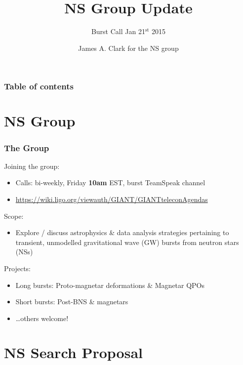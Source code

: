 \documentclass{beamer}
\def\gw#1{gravitational wave#1 (GW#1)\gdef\gw{GW}}
\def\ns#1{neutron star#1 (NS#1)\gdef\ns{NS}}
\begin{document}
\title{NS Group Update}
\subtitle{Burst Call Jan 21$^{\text{st}}$ 2015}  
\author{James A. Clark for the NS group}
\date{} 

\begin{frame}[plain]
\titlepage
\end{frame}

\begin{frame}\frametitle{Table of contents}\tableofcontents
\end{frame} 

\section{NS Group}

\begin{frame}
    \frametitle{The Group}
    Joining the group:
    \begin{itemize}
        \item Calls: bi-weekly, Friday {\bf 10am} EST, burst TeamSpeak channel
        \item
            {\small\href{https://wiki.ligo.org/viewauth/GIANT/GIANTteleconAgendas}
            {https://wiki.ligo.org/viewauth/GIANT/GIANTteleconAgendas}}
    \end{itemize}
    Scope:
    \begin{itemize}
        \item Explore / discuss astrophysics \& data analysis strategies
            pertaining to transient, unmodelled \gw{} bursts from \ns{s}
    \end{itemize}
    Projects:
    \begin{itemize}
        \item Long bursts: Proto-magnetar deformations \& Magnetar QPOs
        \item Short bursts: Post-BNS \& magnetars
        \item \dots others welcome!
    \end{itemize}
\end{frame}

\section{NS Search Proposal}
\end{document}
